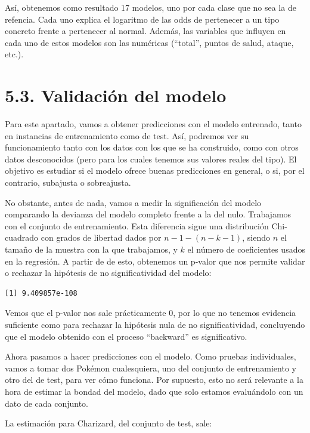 \documentclass[
  12pt,
]{extreport}
\begin{document}
Así, obtenemos como resultado 17 modelos, uno por cada clase que no sea
la de refencia. Cada uno explica el logaritmo de las odds de pertenecer
a un tipo concreto frente a pertenecer al normal. Además, las variables
que influyen en cada uno de estos modelos son las numéricas (``total'',
puntos de salud, ataque, etc.).

\section{5.3. Validación del modelo}\label{validaciuxf3n-del-modelo}

Para este apartado, vamos a obtener predicciones con el modelo
entrenado, tanto en instancias de entrenamiento como de test. Así,
podremos ver su funcionamiento tanto con los datos con los que se ha
construido, como con otros datos desconocidos (pero para los cuales
tenemos sus valores reales del tipo). El objetivo es estudiar si el
modelo ofrece buenas predicciones en general, o si, por el contrario,
subajusta o sobreajusta.

No obstante, antes de nada, vamos a medir la significación del modelo
comparando la devianza del modelo completo frente a la del nulo.
Trabajamos con el conjunto de entrenamiento. Esta diferencia sigue una
distribución Chi-cuadrado con grados de libertad dados por
\(n-1 - (n-k-1)\), siendo \(n\) el tamaño de la muestra con la que
trabajamos, y \(k\) el número de coeficientes usados en la regresión. A
partir de de esto, obtenemos un p-valor que nos permite validar o
rechazar la hipótesis de no significatividad del modelo:

\begin{verbatim}
[1] 9.409857e-108
\end{verbatim}

Vemos que el p-valor nos sale prácticamente 0, por lo que no tenemos
evidencia suficiente como para rechazar la hipótesis nula de no
significatividad, concluyendo que el modelo obtenido con el proceso
``backward'' es significativo.

Ahora pasamos a hacer predicciones con el modelo. Como pruebas
individuales, vamos a tomar dos Pokémon cualesquiera, uno del conjunto
de entrenamiento y otro del de test, para ver cómo funciona. Por
supuesto, esto no será relevante a la hora de estimar la bondad del
modelo, dado que solo estamos evaluándolo con un dato de cada conjunto.

La estimación para Charizard, del conjunto de test, sale:
\end{document}
